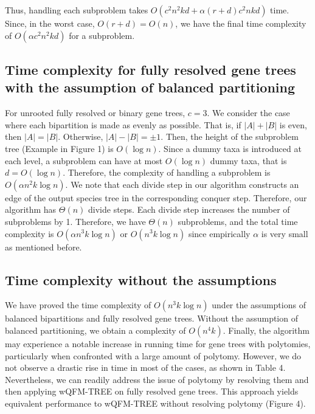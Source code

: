 \documentclass{article}
\begin{document}
Thus, handling each subproblem takes $O\left(c^2 n^2 k d + \alpha (r + d) c^2 n k d\right)$ time. Since, in the worst case, $O(r + d) = O(n)$, we have the final time complexity of $O\left(\alpha c^2 n^2 k d\right)$ for a subproblem.

\subsection{Time complexity for fully resolved gene trees with the assumption of balanced partitioning}

For unrooted fully resolved or binary gene trees, $c = 3$. We consider the case where each bipartition is made as evenly as possible. That is, if $|A| + |B|$ is even, then $|A| = |B|$. Otherwise, $|A| - |B| = \pm 1$. Then, the height of the subproblem tree (Example in Figure 1) is $O(\log n)$. Since a dummy taxa is introduced at each level, a subproblem can have at most $O(\log n)$ dummy taxa, that is $d = O(\log n)$. Therefore, the complexity of handling a subproblem is $O\left(\alpha n^2 k \log n\right)$. We note that each divide step in our algorithm constructs an edge of the output species tree in the corresponding conquer step. Therefore, our algorithm has $\Theta(n)$ divide steps. Each divide step increases the number of subproblems by 1. Therefore, we have $\Theta(n)$ subproblems, and the total time complexity is $O\left(\alpha n^3 k \log n\right)$ or $O\left(n^3 k \log n\right)$ since empirically $\alpha$ is very small as mentioned before.

\subsection{Time complexity without the assumptions}

We have proved the time complexity of $O\left(n^3 k \log n\right)$ under the assumptions of balanced bipartitions and fully resolved gene trees. Without the assumption of balanced partitioning, we obtain a complexity of $O\left(n^4 k\right)$. Finally, the algorithm may experience a notable increase in running time for gene trees with polytomies, particularly when confronted with a large amount of polytomy. However, we do not observe a drastic rise in time in most of the cases, as shown in Table 4. Nevertheless, we can readily address the issue of polytomy by resolving them and then applying wQFM-TREE on fully resolved gene trees. This approach yields equivalent performance to wQFM-TREE without resolving polytomy (Figure 4).
\end{document}
